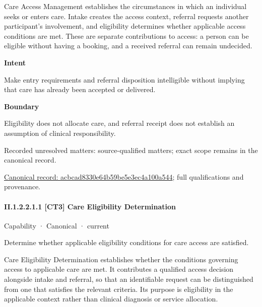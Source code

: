 Care Access Management establishes the circumstances in which an individual seeks or enters care. Intake creates the access context, referral requests another participant's involvement, and eligibility determines whether applicable access conditions are met. These are separate contributions to access: a person can be eligible without having a booking, and a received referral can remain undecided.



\textbf{Intent}



Make entry requirements and referral disposition intelligible without implying that care has already been accepted or delivered.



\textbf{Boundary}



Eligibility does not allocate care, and referral receipt does not establish an assumption of clinical responsibility.


{\small Recorded unresolved matters: source-qualified matters; exact scope remains in the canonical record.}\par
{\footnotesize \href{../../../../continuum/strategy/capability/acbcad8330e64b59be5e3ec4a100a544.md}{Canonical record: acbcad8330e64b59be5e3ec4a100a544}; full qualifications and provenance.}\par
\paragraph*{II.1.2.2.1.1 [CT3] Care Eligibility Determination}
\label{navigation:II.1.2.2.1.1}

\label{element:0922a1141f82416ca9de12054c28a69a}
{\small Capability · Canonical · current}\par

Determine whether applicable eligibility conditions for care access are satisfied.



Care Eligibility Determination establishes whether the conditions governing access to applicable care are met. It contributes a qualified access decision alongside intake and referral, so that an identifiable request can be distinguished from one that satisfies the relevant criteria. Its purpose is eligibility in the applicable context rather than clinical diagnosis or service allocation.



